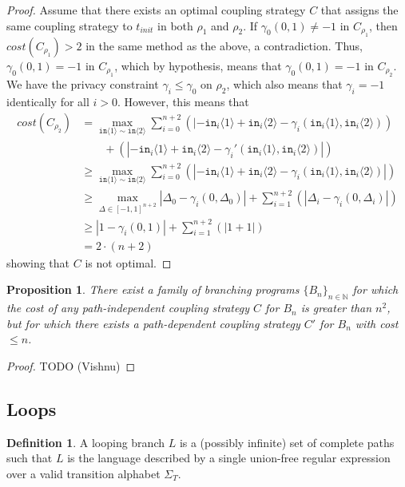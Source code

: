 \documentclass[12pt]{article}
\newcommand{\NN}{\mathbb{N}}
\newcommand{\brangle}[1]{\langle #1 \rangle}
\newtheorem{prop}[thm]{Proposition}
\theoremstyle{definition}
\newtheorem{defn}[thm]{Definition}
\begin{document}
\begin{proof}
    Assume that there exists an optimal coupling strategy $C$ that assigns the same coupling strategy to $t_{init}$ in both $\rho_1$ and $\rho_2$. If $\gamma_0(0, 1) \neq -1$ in $C_{\rho_1}$, then $cost(C_{\rho_1}) > 2$ in the same method as the above, a contradiction. 
    Thus, $\gamma_0(0, 1) = -1$ in $C_{\rho_1}$, which by hypothesis, means that $\gamma_0(0, 1) = -1$ in $C_{\rho_2}$. We have the privacy constraint $\gamma_i \leq \gamma_0$ on $\rho_2$, which also means that $\gamma_i = -1$ identically for all $i > 0$. However, this means that 
    \begin{align*}
        cost(C_{\rho_2}) &= \max_{\texttt{in}\brangle{1}\sim\texttt{in}\brangle{2}}\sum_{i=0}^{n+2}(|-\texttt{in}_i\brangle{1}+\texttt{in}_i\brangle{2}-\gamma_i(\texttt{in}_i\brangle{1}, \texttt{in}_i\brangle{2}))\\&\qquad+(|-\texttt{in}_i\brangle{1}+\texttt{in}_i\brangle{2}-\gamma_i'(\texttt{in}_i\brangle{1}, \texttt{in}_i\brangle{2})|)\\
        &\geq \max_{\texttt{in}\brangle{1}\sim\texttt{in}\brangle{2}} \sum_{i=0}^{n+2}(|-\texttt{in}_i\brangle{1}+\texttt{in}_i\brangle{2}-\gamma_i(\texttt{in}_i\brangle{1}, \texttt{in}_i\brangle{2})|)\\
        &\geq \max_{\Delta \in [-1, 1]^{n+2}} |\Delta_0 - \gamma_i(0, \Delta_0)| + \sum_{i=1}^{n+2}(|\Delta_i-\gamma_i(0, \Delta_i)|)\\
        &\geq |1 - \gamma_i(0, 1)| + \sum_{i=1}^{n+2}(|1+1|)\\
        &= 2 \cdot (n + 2)
    \end{align*}
    showing that $C$ is not optimal.
\end{proof}

\begin{prop}
    There exist a family of branching programs $\{B_n\}_{n\in \NN}$ for which the cost of any path-independent coupling strategy $C$ for $B_n$ is greater than $n^2$, but for which there exists a path-dependent coupling strategy $C'$ for $B_n$ with cost $\leq n$.
\end{prop}

\begin{proof}
    TODO (Vishnu)
\end{proof}


\subsection{Loops}

\begin{defn}
    A looping branch $L$ is a (possibly infinite) set of complete paths such that $L$ is the language described by a single union-free regular expression over a valid transition alphabet $\Sigma_T$.
\end{defn}
\end{document}
